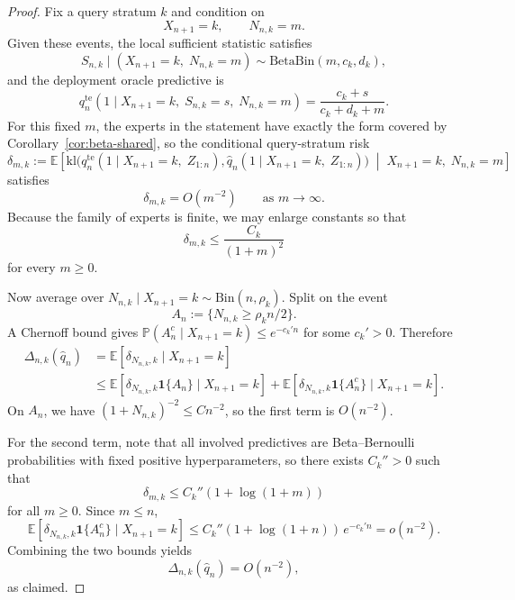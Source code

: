 \documentclass{article}
\theoremstyle{definition}
\theoremstyle{remark}
\newcommand{\E}{\mathbb{E}}
\newcommand{\Pbb}{\mathbb{P}}
\newcommand{\BetaBin}{\mathrm{BetaBin}}
\newcommand{\Bin}{\mathrm{Bin}}
\newcommand{\ind}{\mathbf{1}}
\newcommand{\te}{\mathrm{te}}
\newcommand{\klb}{\mathrm{kl}}
\begin{document}
\begin{proof}
Fix a query stratum $k$ and condition on
\[
X_{n+1}=k,
\qquad
N_{n,k}=m.
\]
Given these events, the local sufficient statistic satisfies
\[
S_{n,k}\mid (X_{n+1}=k,\;N_{n,k}=m)\sim \BetaBin(m,c_k,d_k),
\]
and the deployment oracle predictive is
\[
q_n^{\te}(1\mid X_{n+1}=k,\;S_{n,k}=s,\;N_{n,k}=m)
=
\frac{c_k+s}{c_k+d_k+m}.
\]
For this fixed $m$, the experts in the statement have exactly the form covered by Corollary~\ref{cor:beta-shared}, so the conditional query-stratum risk
\[
\delta_{m,k}
:=
\E\!\left[
\klb\bigl(
q_n^{\te}(1\mid X_{n+1}=k,\;Z_{1:n}),
\hat q_n(1\mid X_{n+1}=k,\;Z_{1:n})
\bigr)
\;\middle|\;
X_{n+1}=k,\;N_{n,k}=m
\right]
\]
satisfies
\[
\delta_{m,k}=O(m^{-2})
\qquad\text{as } m\to\infty.
\]
Because the family of experts is finite, we may enlarge constants so that
\[
\delta_{m,k}\le \frac{C_k}{(1+m)^2}
\]
for every $m\ge 0$.

Now average over $N_{n,k}\mid X_{n+1}=k\sim \Bin(n,\rho_k)$. Split on the event
\[
A_n:=\{N_{n,k}\ge \rho_k n/2\}.
\]
A Chernoff bound gives $\Pbb(A_n^c\mid X_{n+1}=k)\le e^{-c_k'n}$ for some $c_k'>0$. Therefore
\begin{align*}
\Delta_{n,k}(\hat q_n)
&=
\E[\delta_{N_{n,k},k}\mid X_{n+1}=k] \\
&\le
\E[\delta_{N_{n,k},k}\ind\{A_n\}\mid X_{n+1}=k]
+
\E[\delta_{N_{n,k},k}\ind\{A_n^c\}\mid X_{n+1}=k].
\end{align*}
On $A_n$, we have $(1+N_{n,k})^{-2}\le C n^{-2}$, so the first term is $O(n^{-2})$.

For the second term, note that all involved predictives are Beta--Bernoulli probabilities with fixed positive hyperparameters, so there exists $C_k''>0$ such that
\[
\delta_{m,k}\le C_k''(1+\log(1+m))
\]
for all $m\ge 0$. Since $m\le n$,
\[
\E[\delta_{N_{n,k},k}\ind\{A_n^c\}\mid X_{n+1}=k]
\le
C_k''(1+\log(1+n))\,e^{-c_k'n}
=
o(n^{-2}).
\]
Combining the two bounds yields
\[
\Delta_{n,k}(\hat q_n)=O(n^{-2}),
\]
as claimed.
\end{proof}
\end{document}

